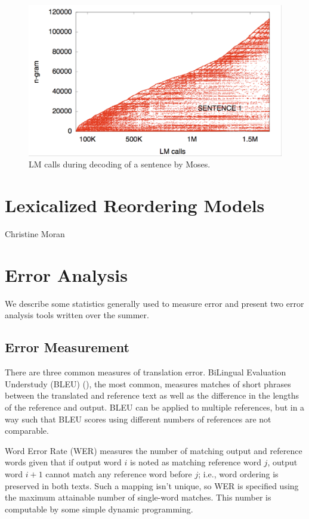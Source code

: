 \documentclass[10pt]{report}
\theoremstyle{plain}
\begin{document}
{\begin{figure}
\begin{center}
\label{fig:LM-calls}
\caption{LM calls during decoding of a sentence by Moses.}
 \includegraphics[width=\columnwidth]{marcello-lmcalls}
\end{center}
 \end{figure}

\section{Lexicalized Reordering Models}
{\sc Christine Moran}

\section{Error Analysis}
We describe some statistics generally used to measure error and present two error analysis tools written over the summer.

\subsection{Error Measurement}
There are three common measures of translation error. BiLingual Evaluation Understudy (BLEU) (\cite{bleu}), the most common, measures matches of short phrases between the translated and reference text as well as the difference in the lengths of the reference and output. BLEU can be applied to multiple references, but in a way such that BLEU scores using different numbers of references are not comparable.

Word Error Rate (WER) measures the number of matching output and reference words given that if output word $i$ is noted as matching reference word $j$, output word $i + 1$ cannot match any reference word before $j$; i.e., word ordering is preserved in both texts. Such a mapping isn't unique, so WER is specified using the maximum attainable number of single-word matches. This number is computable by some simple dynamic programming.

}
\end{document}
